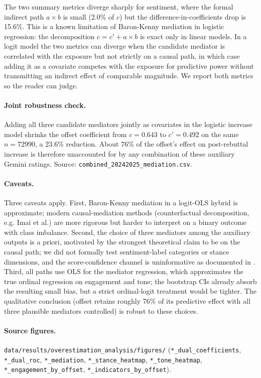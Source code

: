 \documentclass{article}
\newcommand{\code}[1]{\texttt{#1}}
\begin{document}
The two summary metrics diverge sharply for sentiment, where the formal indirect path $a \times b$ is small (2.0\% of $c$) but the difference-in-coefficients drop is 15.6\%. This is a known limitation of Baron-Kenny mediation in logistic regression: the decomposition $c = c' + a \times b$ is exact only in linear models. In a logit model the two metrics can diverge when the candidate mediator is correlated with the exposure but not strictly on a causal path, in which case adding it as a covariate competes with the exposure for predictive power without transmitting an indirect effect of comparable magnitude. We report both metrics so the reader can judge.

\paragraph{Joint robustness check.}
Adding all three candidate mediators jointly as covariates in the logistic increase model shrinks the offset coefficient from $c = 0.643$ to $c' = 0.492$ on the same $n = \num{72990}$, a 23.6\% reduction. About 76\% of the offset's effect on post-rebuttal increase is therefore unaccounted for by any combination of these auxiliary Gemini ratings. Source: \code{combined\_20242025\_mediation.csv}.

\paragraph{Caveats.}
Three caveats apply. First, Baron-Kenny mediation in a logit-OLS hybrid is approximate; modern causal-mediation methods (counterfactual decomposition, e.g. Imai et al.) are more rigorous but harder to interpret on a binary outcome with class imbalance. Second, the choice of three mediators among the auxiliary outputs is a priori, motivated by the strongest theoretical claim to be on the causal path; we did not formally test sentiment-label categories or stance dimensions, and the score-confidence channel is uninformative as documented in . Third, all paths use OLS for the mediator regression, which approximates the true ordinal regression on engagement and tone; the bootstrap CIs already absorb the resulting small bias, but a strict ordinal-logit treatment would be tighter. The qualitative conclusion (offset retains roughly 76\% of its predictive effect with all three plausible mediators controlled) is robust to these choices.

\paragraph{Source figures.}
\code{data/results/overestimation\_analysis/figures/} (\code{*\_dual\_coefficients}, \code{*\_dual\_roc}, \code{*\_mediation}, \code{*\_stance\_heatmap}, \code{*\_tone\_heatmap}, \code{*\_engagement\_by\_offset}, \code{*\_indicators\_by\_offset}).
\end{document}
